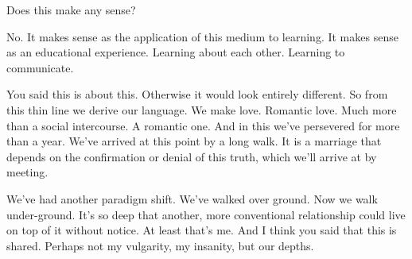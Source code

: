 

Does this make any sense?  

No.  It makes sense as the application of this medium to learning.  It
makes sense as an educational experience.  Learning about each other.
Learning to communicate.  

You said this is about this.  Otherwise it would look entirely
different.  So from this thin line we derive our language.  We make
love.  Romantic love.  Much more than a social intercourse.  A
romantic one.  And in this we've persevered for more than a year.
We've arrived at this point by a long walk.  It is a marriage that
depends on the confirmation or denial of this truth, which we'll
arrive at by meeting.

We've had another paradigm shift.  We've walked over ground.  Now we
walk under-ground.  It's so deep that another, more conventional
relationship could live on top of it without notice.  At least that's
me.  And I think you said that this is shared.  Perhaps not my
vulgarity, my insanity, but our depths.

\bye
